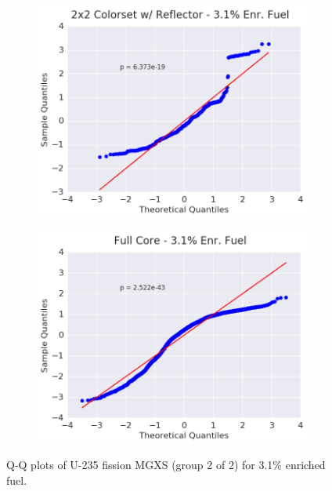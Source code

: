 \begin{figure}[h!]
\begin{subfigure}{0.5\textwidth}
  \includegraphics[width=\linewidth]{figures/patterns/reflector/quantile/31-enr-fiss-2}  \caption{}
  \label{fig:chap9-qq-reflector-3.1-fiss}
\end{subfigure}%
\begin{subfigure}{0.5\textwidth}
  \centering
  \includegraphics[width=\linewidth]{figures/patterns/full-core/quantile/31-enr-fiss-2} \caption{}
  \label{fig:chap9-qq-full-core-3.1-fiss}
\end{subfigure}
\caption[Q-Q plots of U-235 fission MGXS 3.1\% enriched fuel]{\ac{Q-Q} plots of U-235 fission \ac{MGXS} (group 2 of 2) for 3.1\% enriched fuel.}
\label{fig:chap9-qq-3.1-fiss}
\end{figure}

